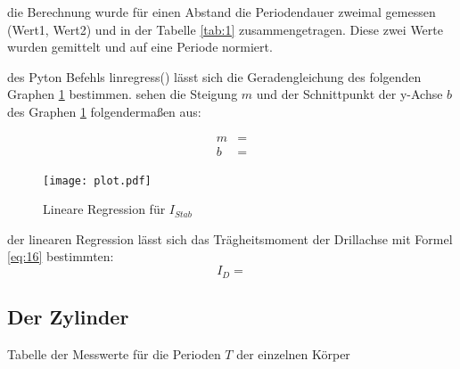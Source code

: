  die Berechnung wurde für einen Abstand die Periodendauer zweimal gemessen (Wert1, Wert2) und in der Tabelle \ref{tab:1}
zusammengetragen. Diese zwei Werte wurden gemittelt und auf eine Periode normiert.

\justifying des Pyton Befehls linregress() \cite{numpy} lässt sich die Geradengleichung
des folgenden Graphen \ref{fig:1} bestimmen. 
\justifying sehen die Steigung $m$ und der Schnittpunkt der y-Achse $b$ des Graphen \ref{fig:1} folgendermaßen aus:

\begin{subequations}
\begin{align}
m &= \text{}\label{eq:17a}\\
b &= \text{}\label{eq:17b}
\end{align}
\end{subequations}

\begin{figure}[H]
    \centering
    \texttt{[image: plot.pdf]}
    \caption{Lineare Regression für $I_{Stab}$}
    \label{fig:1}
\end{figure}

\justifying der linearen Regression lässt sich das Trägheitsmoment der Drillachse mit Formel \eqref{eq:16} bestimmten:
\begin{equation}
I_D = \label{eq:18} %
\end{equation}

\subsection{Der Zylinder}\justifying %
\label{sec:5.5}
\begin{table}[H]
    \centering
    
    \caption{Tabelle der Messwerte für die Perioden $T$ der einzelnen Körper}
    \label{tab:3}
\end{table}

